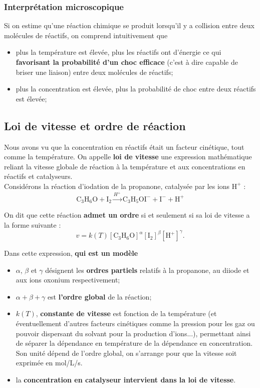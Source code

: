 \documentclass[11pt,a4paper]{report}
\begin{document}
\subsubsection{Interprétation microscopique}

Si on estime qu'une réaction chimique se produit lorsqu'il y a collision entre deux molécules de réactifs, on comprend intuitivement que
\begin{itemize}
	\item plus la température est élevée, plus les réactifs ont d'énergie ce qui \textbf{favorisant la probabilité d'un choc efficace} (c'est à dire capable de briser une liaison) entre deux molécules de réactifs;
	\item plus la concentration est élevée, plus la probabilité de choc entre deux réactifs est 		élevée;
\end{itemize}

\subsection{Loi de vitesse et ordre de réaction}

Nous avons vu que la concentration en réactifs était un facteur cinétique, tout comme la température. On appelle \textbf{loi de vitesse} une expression mathématique reliant la vitesse globale de réaction à la température et aux concentrations en réactifs et catalyseurs.\\

Considérons la réaction d'iodation de la propanone, catalysée par les ions $\text{H}^+$ :
\begin{equation}
	\text{C}_3\text{H}_6\text{O} + \text{I}_2 \xrightarrow{H^+} 
	\text{C}_3\text{H}_5\text{O}\text{I}^- + \text{I}^- + \text{H}^+
\end{equation}

On dit que cette réaction \textbf{admet un ordre} si et seulement si sa loi de vitesse a la forme suivante :
\begin{equation}
	\boxed{v = k(T)[\text{C}_3\text{H}_6\text{O}]^\alpha [\text{I}_2]^\beta [\text{H}^+]^\gamma}.
\end{equation}

Dans cette expression, \textbf{qui est un modèle}
\begin{itemize}
	\item $\alpha$, $\beta$ et $\gamma$ désignent les \textbf{ordres partiels} relatifs à la propanone, au diiode et aux ions oxonium respectivement;
	\item $\alpha + \beta + \gamma$ est \textbf{l'ordre global} de la réaction;
	\item $k(T)$, \textbf{constante de vitesse} est fonction de la température (et éventuellement d'autres facteurs cinétiques comme la pression pour les gaz ou pouvoir dispersant du solvant pour la production d'ions...), permettant ainsi de séparer la dépendance en température de la dépendance en concentration. Son unité dépend de l'ordre global, on s'arrange pour que la vitesse soit exprimée en mol/L/s.
	\item la \textbf{concentration en catalyseur intervient dans la loi de vitesse}.
\end{itemize}
\end{document}
